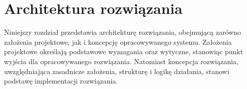 \chapter{Architektura rozwiązania}

Niniejszy rozdział przedstawia architekturę rozwiązania, obejmującą zarówno założenia projektowe, jak i koncepcję opracowywanego systemu. Założenia projektowe określają podstawowe wymagania oraz wytyczne, stanowiąc punkt wyjścia dla opracowywanego rozwiązania. Natomiast koncepcja rozwiązania, uwzględniająca zasadnicze założenia, strukturę i logikę działania, stanowi podstawę implementacji rozwiązania.












